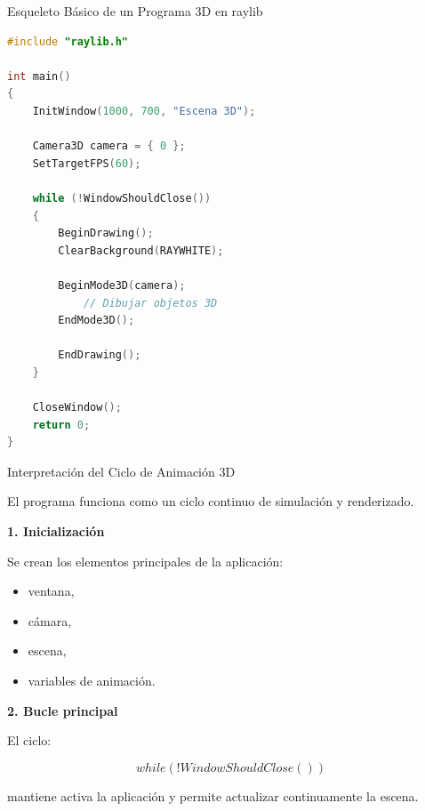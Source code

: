 \documentclass{beamer}
\begin{document}
\begin{frame}[fragile]{Esqueleto Básico de un Programa 3D en raylib}

\begin{lstlisting}[language=C++,basicstyle=\ttfamily\tiny]
#include "raylib.h"

int main()
{
    InitWindow(1000, 700, "Escena 3D");

    Camera3D camera = { 0 };
    SetTargetFPS(60);

    while (!WindowShouldClose())
    {
        BeginDrawing();
        ClearBackground(RAYWHITE);

        BeginMode3D(camera);
            // Dibujar objetos 3D
        EndMode3D();

        EndDrawing();
    }

    CloseWindow();
    return 0;
}
\end{lstlisting}

\end{frame}

\begin{frame}{Interpretación del Ciclo de Animación 3D}

El programa funciona como un ciclo continuo de simulación y renderizado.

\vspace{0.5cm}

\textbf{1. Inicialización}

\vspace{0.2cm}

Se crean los elementos principales de la aplicación:

\begin{itemize}
    \item ventana,
    \item cámara,
    \item escena,
    \item variables de animación.
\end{itemize}

\vspace{0.5cm}

\textbf{2. Bucle principal}

\vspace{0.2cm}

El ciclo:

$$
while(!WindowShouldClose())
$$

mantiene activa la aplicación y permite actualizar continuamente la escena.

\end{frame}
\end{document}
